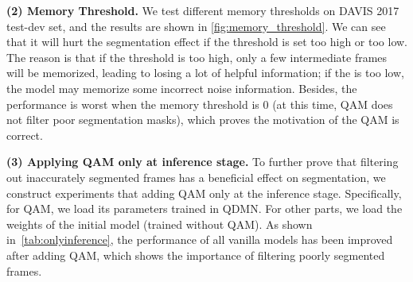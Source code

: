 \documentclass[runningheads]{llncs}
\begin{document}
    
    
    \textbf{(2) Memory Threshold.} We test different memory thresholds  on DAVIS 2017 test-dev set, and the results are shown in \cref{fig:memory_threshold}. 
    We can see that it will hurt the segmentation effect if the threshold is set too high or too low.
    The reason is that if the threshold  is too high, only a few intermediate frames will be memorized, leading to losing a lot of helpful information; if the  is too low, the model may memorize some incorrect noise information.
    Besides, the performance is worst when the memory threshold is 0 (at this time, QAM does not filter poor segmentation masks), which proves the motivation of the QAM is correct. 
    


    \textbf{(3) Applying QAM only at inference stage.}
    To further prove that filtering out inaccurately segmented frames has a beneficial effect on segmentation, 
    we construct experiments that adding QAM only at the inference stage. 
    Specifically, for QAM, we load its parameters trained in QDMN.
    For other parts, we load the weights of the initial model (trained without QAM).
    As shown in~\cref{tab:onlyinference}, the performance of all vanilla models has been improved after adding QAM, which shows the importance of filtering poorly segmented frames.\\
    
\end{document}
